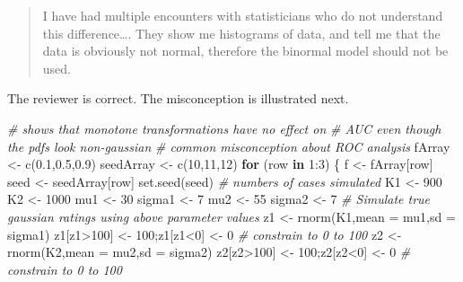\documentclass[
]{book}
\newenvironment{Shaded}{\begin{snugshade}}{\end{snugshade}}
\newcommand{\AttributeTok}[1]{\textcolor[rgb]{0.77,0.63,0.00}{#1}}
\newcommand{\CommentTok}[1]{\textcolor[rgb]{0.56,0.35,0.01}{\textit{#1}}}
\newcommand{\ControlFlowTok}[1]{\textcolor[rgb]{0.13,0.29,0.53}{\textbf{#1}}}
\newcommand{\DecValTok}[1]{\textcolor[rgb]{0.00,0.00,0.81}{#1}}
\newcommand{\FloatTok}[1]{\textcolor[rgb]{0.00,0.00,0.81}{#1}}
\newcommand{\FunctionTok}[1]{\textcolor[rgb]{0.00,0.00,0.00}{#1}}
\newcommand{\NormalTok}[1]{#1}
\newcommand{\OtherTok}[1]{\textcolor[rgb]{0.56,0.35,0.01}{#1}}
\newcommand{\SpecialCharTok}[1]{\textcolor[rgb]{0.00,0.00,0.00}{#1}}
\begin{document}
\begin{quote}
I have had multiple encounters with statisticians who do not understand this difference\ldots. They show me histograms of data, and tell me that the data is obviously not normal, therefore the binormal model should not be used.
\end{quote}

The reviewer is correct. The misconception is illustrated next.

\begin{Shaded}
\begin{Highlighting}[]
\CommentTok{\# shows that monotone transformations have no effect on }
\CommentTok{\# AUC even though the pdfs look non{-}gaussian}
\CommentTok{\# common misconception about ROC analysis}
\NormalTok{fArray }\OtherTok{\textless{}{-}} \FunctionTok{c}\NormalTok{(}\FloatTok{0.1}\NormalTok{,}\FloatTok{0.5}\NormalTok{,}\FloatTok{0.9}\NormalTok{)}
\NormalTok{seedArray }\OtherTok{\textless{}{-}} \FunctionTok{c}\NormalTok{(}\DecValTok{10}\NormalTok{,}\DecValTok{11}\NormalTok{,}\DecValTok{12}\NormalTok{)}
\ControlFlowTok{for}\NormalTok{ (row }\ControlFlowTok{in} \DecValTok{1}\SpecialCharTok{:}\DecValTok{3}\NormalTok{) \{ }
\NormalTok{  f }\OtherTok{\textless{}{-}}\NormalTok{ fArray[row]}
\NormalTok{  seed }\OtherTok{\textless{}{-}}\NormalTok{ seedArray[row]}
  \FunctionTok{set.seed}\NormalTok{(seed) }
  \CommentTok{\# numbers of cases simulated}
\NormalTok{  K1 }\OtherTok{\textless{}{-}} \DecValTok{900}
\NormalTok{  K2 }\OtherTok{\textless{}{-}} \DecValTok{1000}
\NormalTok{  mu1 }\OtherTok{\textless{}{-}} \DecValTok{30}
\NormalTok{  sigma1 }\OtherTok{\textless{}{-}} \DecValTok{7}
\NormalTok{  mu2 }\OtherTok{\textless{}{-}} \DecValTok{55}
\NormalTok{  sigma2 }\OtherTok{\textless{}{-}} \DecValTok{7} 
  \CommentTok{\# Simulate true gaussian ratings using above parameter values}
\NormalTok{  z1 }\OtherTok{\textless{}{-}} \FunctionTok{rnorm}\NormalTok{(K1,}\AttributeTok{mean =}\NormalTok{ mu1,}\AttributeTok{sd =}\NormalTok{ sigma1)}
\NormalTok{  z1[z1}\SpecialCharTok{\textgreater{}}\DecValTok{100}\NormalTok{] }\OtherTok{\textless{}{-}} \DecValTok{100}\NormalTok{;z1[z1}\SpecialCharTok{\textless{}}\DecValTok{0}\NormalTok{] }\OtherTok{\textless{}{-}} \DecValTok{0} \CommentTok{\# constrain to 0 to 100}
\NormalTok{  z2 }\OtherTok{\textless{}{-}} \FunctionTok{rnorm}\NormalTok{(K2,}\AttributeTok{mean =}\NormalTok{ mu2,}\AttributeTok{sd =}\NormalTok{ sigma2)}
\NormalTok{  z2[z2}\SpecialCharTok{\textgreater{}}\DecValTok{100}\NormalTok{] }\OtherTok{\textless{}{-}} \DecValTok{100}\NormalTok{;z2[z2}\SpecialCharTok{\textless{}}\DecValTok{0}\NormalTok{] }\OtherTok{\textless{}{-}} \DecValTok{0} \CommentTok{\# constrain to 0 to 100}

\end{Highlighting}
\end{Shaded}
\end{document}
